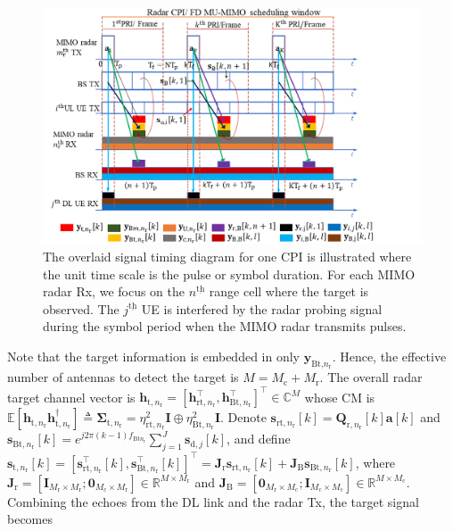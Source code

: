 \documentclass[10pt,journal]{IEEEtran}
\newcommand{\paren}[1]{\left({#1}\right)}
\newcommand{\bracket}[1]{{\left [{#1}\right ]}}
\newcommand{\ith}[1]    {{#1}^{\underline{\text{th}}}}
\newcommand{\rr}{_\mathrm{r}}
\newcommand{\cc}{_\mathrm{c}}
\newcommand{\target}{\mathrm{t}}
\newcommand{\MM}{\mathit{M}}
\newcommand{\stnrk}{\mathbf{s}_{\textrm{t},n_{\textrm{r}}}\bracket{k}}
\newcommand{\srtnrk}{\mathbf{s}_{\textrm{rt},n_{\textrm{r}}}\bracket{k}}
\newcommand{\sBtnrk}{\mathbf{s}_{\textrm{Bt},n_{\textrm{r}}}\bracket{k}}
\theoremstyle{definition}
\begin{document}
\begin{figure}[!t]
		\centering
		\includegraphics[width=1.0\columnwidth]{system_model_TSP.png}
		\caption{The overlaid signal timing diagram for one CPI is illustrated where the unit time scale is the pulse or symbol duration. For each MIMO radar Rx, we focus on the $\ith{n}$ range cell where the target is observed. The $\ith{j}$ UE is interfered by the radar probing signal during the symbol period when the MIMO radar transmits pulses. %
		} 
		\label{fig:systemmodel}
	\end{figure} %
Note that the target information is embedded in only  $\mathbf{y}_{\textrm{Bt,}n\rr}$. Hence, the effective number of antennas to detect the target is $\mathit{M}=\mathit{M}\cc+\MM\rr$. The overall radar target channel vector is $\mathbf{h}_{\target,n\rr}=\bracket{\mathbf{h}^\top_{\textrm{rt},n\rr},\mathbf{h}^\top_{\textrm{Bt},n\rr}}^\top\in\mathbb{C}^{\mathit{M}}$ whose CM is $\mathbb{E}\bracket{\mathbf{h}_{\target,n\rr}\mathbf{h}^\dagger_{\target,n\rr}}\triangleq\boldsymbol{\Sigma}_{\target,n\rr}=\eta^2_{\textrm{rt},n\rr}\mathbf{I}\oplus\eta^2_{\textrm{Bt},n\rr}\mathbf{I}$. Denote $\mathbf{s}_{\mathrm{rt,}n\rr}\bracket{k}=\mathbf{Q}_{\mathrm{r,}n\rr}\bracket{k}\mathbf{a}\bracket{k}$ and $\mathbf{s}_{\mathrm{Bt},n\rr}\bracket{k}=e^{j2\pi\paren{k-1} f_{\mathrm{Bt}n_\mathrm{r}}}
\sum_{j=1}^\mathit{J}\mathbf{s}_{\textrm{d},j}\bracket{k}$, and define $\stnrk=\bracket{\mathbf{s}^\top_{\textrm{rt},n\rr}\bracket{k},\mathbf{s}^\top_{\textrm{Bt},n\rr}\bracket{k}}^\top=\mathbf{J}_{\textrm{r}}\srtnrk+\mathbf{J}_{\textrm{B}}\sBtnrk$, where $\mathbf{J}_{\textrm{r}}=\bracket{\mathbf{I}_{\mathit{M}\rr\times \mathit{M}\rr};\mathbf{0}_{\mathit{M}\cc\times \mathit{M}\rr}}\in\mathbb{R}^{\mathbf{\mathit{M}\times \mathit{M}\rr}}$ and $\mathbf{J}_{\textrm{B}}=\bracket{\mathbf{0}_{\mathit{M}\rr\times \mathit{M}\cc};\mathbf{I}_{\mathit{M}\cc\times \mathit{M}\cc}}\in\mathbb{R}^{\mathbf{\mathit{M}\times \mathit{M}\cc}}$. Combining the echoes from the DL link and the radar Tx, the target signal becomes
\end{document}

